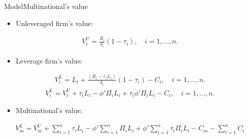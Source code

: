 \documentclass{beamer}
\begin{document}
\begin{frame}{Model}{Multinational's value}
\begin{itemize}
	\item  Unleveraged firm's value:
\end{itemize}
\begin{equation}
\begin{aligned}
V_i^U=\frac{R_i}{\delta_i}(1-\tau_{i}),  \quad i=1,...,n.
\end{aligned}
\label{eq:v_u}
\end{equation}
\begin{itemize}
	\item Leverage firm's value:
\end{itemize}
\begin{equation}
\begin{aligned}
V_i^L=L_i+\frac{(R_i-r_iL_i)}{\delta_i}(1-\tau_{i})-C_i,  \quad i=1,...,n.
\end{aligned}
\label{eq:v_l_1}
\end{equation}
\begin{equation}
\begin{aligned}
V_i^L=V_i^U+\tau_{i}L_i-\phi'\Pi_iL_i+\tau_{i}\phi'\Pi_iL_i-C_i,  \quad i=1,...,n.
\end{aligned}
\label{eq:v_l_2}
\end{equation}	
\begin{itemize}
	\item Multinational's value:
\end{itemize}
\begin{equation}
\begin{aligned}
V_m^L=V_m^U+\sum_{i=1}^{n}\tau_iL_i-\phi'\sum_{i=1}^{n}\Pi_iL_i+\phi'\sum_{i=1}^{n}\tau_i\Pi_i L_i-C_m-\sum_{i=1}^{n}C_i
\end{aligned}
\label{eq:v_l}
\end{equation}
\end{frame}
\end{document}

